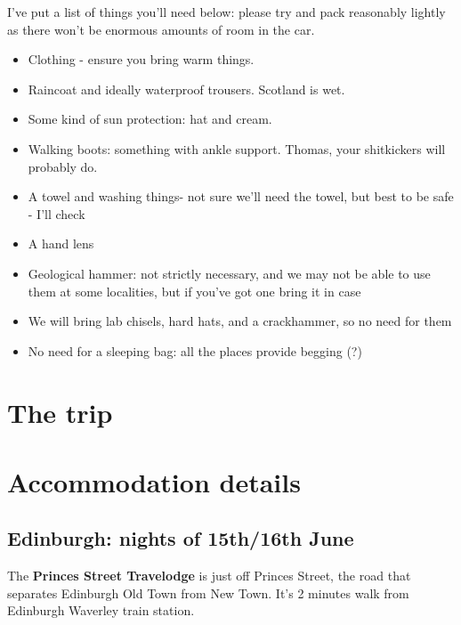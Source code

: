 \documentclass[12pt,letterpaper]{article}
\begin{document}
I've put a list of things you'll need below: please try and pack reasonably lightly as there won't be enormous amounts of room in the car.
\linebreak
\begin{itemize}
  \item Clothing - ensure you bring warm things.
  \item Raincoat and ideally waterproof trousers. Scotland is wet.
  \item Some kind of sun protection: hat and cream.
  \item Walking boots: something with ankle support.  Thomas, your shitkickers will probably do.
  \item A towel and washing things- not sure we'll need the towel, but best to be safe - I'll check
  \item A hand lens
  \item Geological hammer: not strictly necessary, and we may not be able to use them at some localities, but if you've got one bring it in case
\linebreak
\linebreak
\linebreak
  \item We will bring lab chisels, hard hats, and a crackhammer, so no need for them
  \item No need for a sleeping bag: all the places provide begging (?)

\end{itemize}

\pagebreak


\section{The trip}


\pagebreak
\section{Accommodation details}

\subsection{Edinburgh: nights of 15th/16th June}

The \textbf{Princes Street Travelodge} is just off Princes Street, the road that separates Edinburgh Old Town from New Town. It's 2 minutes walk from Edinburgh Waverley train station.
\end{document}

